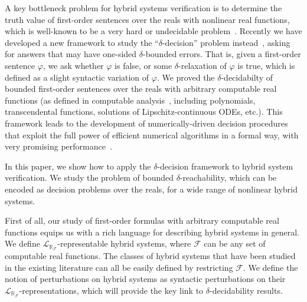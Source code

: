 \documentclass[envcountsect]{llncs}
\newcommand{\lrf}{\mathcal{L}_{\mathbb{R}_{\mathcal{F}}}}
\begin{document}
A key bottleneck problem for hybrid systems verification is to determine the
truth
value of first-order sentences over the reals with nonlinear real functions,
which is well-known to be a very hard or undecidable problem~\cite{}. Recently
we have developed a new framework to study the ``$\delta$-decision'' problem
instead~\cite{}, asking for answers that may have one-sided $\delta$-bounded
errors. That is, given a first-order sentence $\varphi$, we ask whether
$\varphi$ is false, or some $\delta$-relaxation of $\varphi$ is true, which is
defined as a slight syntactic variation of $\varphi$. We proved the
$\delta$-decidabilty of bounded first-order sentences over the reals with
arbitrary computable real functions (as
defined in computable analysis~\cite{CAbook}, including polynomials,
transcendental functions, solutions of Lipschitz-continuous ODEs, etc.).
This framework leads to the development of numerically-driven decision
procedures that exploit the full power of efficient numerical algorithms in a
formal way, with very promising performance~\cite{}.

In this paper, we show how to apply the $\delta$-decision framework to
hybrid system verification. We study the problem of bounded
$\delta$-reachability, which can be encoded as decision
problems over the reals, for a wide range of nonlinear hybrid systems. 

First of all, our study of first-order formulas with arbitrary computable real
functions equips us with a rich language for describing hybrid systems in
general. We define $\lrf$-representable hybrid systems, where $\mathcal{F}$ can
be any set of computable real functions. The classes of hybrid systems that have
been studied in the existing literature can all be easily defined by restricting
$\mathcal{F}$. We define the notion of perturbations on hybrid
systems as syntactic perturbations on their $\lrf$-representations, which
 will provide the key link to $\delta$-decidability results. 
\end{document}
